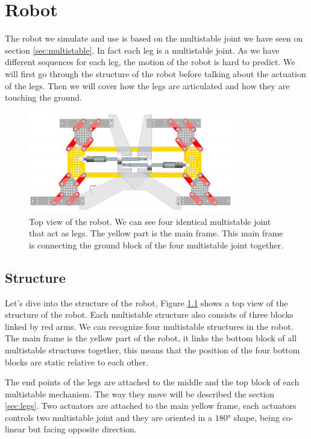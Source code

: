 \chapter{Robot}
    The robot we simulate and use is based on the multistable joint we have seen on section \ref{sec:multistable}. In fact each leg is a multistable joint. As we have different sequences for each leg, the motion of the robot is hard to predict. We will first go through the structure of the robot before talking about the actuation of the legs. Then we will cover how the legs are articulated and how they are touching the ground. 
    
    \begin{figure}[h!]
        \centering
        \includegraphics[width=0.8\textwidth]{images/top_view_robot.png}
        \caption{Top view of the robot. We can see four identical multistable joint that act as legs. The yellow part is the main frame. This main frame is connecting the ground block of the four multistable joint together. }
        \label{fig:robot_top_view}
    \end{figure}
    
    \section{Structure}
        Let's dive into the structure of the robot, Figure \ref{fig:robot_top_view} shows a top view of the structure of the robot. Each multistable structure also consists of three blocks linked by red arms. We can recognize four multistable structures in the robot. The main frame is the yellow part of the robot, it links the bottom block of all multistable structures together, this means that the position of the four bottom blocks are static relative to each other. 
        
        
        The end points of the legs are attached to the middle and the top block of each multistable mechanism. The way they move will be described the section \ref{sec:legs}. Two actuators are attached to the main yellow frame, each actuators controls two multistable joint and they are oriented in a $180°$ shape, being co-linear but facing opposite direction. 
        
